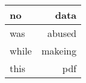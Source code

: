 \documentclass{article}
\begin{document}
\begin{center}
    \begin{tabular}{ l | r }
        \hline
        no & data \\ \hline
        was & abused \\ \hline
        while & makeing \\ \hline
        this & pdf \\
        \hline
    \end{tabular}
\end{center}
\end{document}

